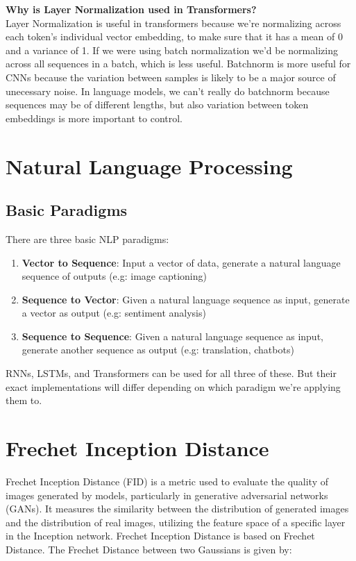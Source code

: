 \documentclass[12pt]{article}
\begin{document}
\textbf{Why is Layer Normalization used in Transformers?} \\
Layer Normalization is useful in transformers because we're normalizing across each token's individual vector embedding, to make sure that it has a mean of 0 and a variance of 1. If we were using batch normalization we'd be normalizing across all sequences in a batch, which is less useful. Batchnorm is more useful for CNNs because the variation between samples is likely to be a major source of unecessary noise. In language models, we can't really do batchnorm because sequences may be of different lengths, but also variation between token embeddings is more important to control.

\section{Natural Language Processing}
\subsection{Basic Paradigms}
There are three basic NLP paradigms: 
\begin{enumerate}
	\item \textbf{Vector to Sequence}: Input a vector of data, generate a natural language sequence of outputs (e.g: image captioning)
	\item \textbf{Sequence to Vector}: Given a natural language sequence as input, generate a vector as output (e.g: sentiment analysis)
	\item \textbf{Sequence to Sequence}: Given a natural language sequence as input, generate another sequence as output (e.g: translation, chatbots)
\end{enumerate}
RNNs, LSTMs, and Transformers can be used for all three of these. But their exact implementations will differ depending on which paradigm we're applying them to.

\section{Frechet Inception Distance}
Frechet Inception Distance (FID) is a metric used to evaluate the quality of images generated by models, particularly in generative adversarial networks (GANs). It measures the similarity between the distribution of generated images and the distribution of real images, utilizing the feature space of a specific layer in the Inception network. Frechet Inception Distance is based on Frechet Distance. The Frechet Distance between two Gaussians is given by:
\end{document}
